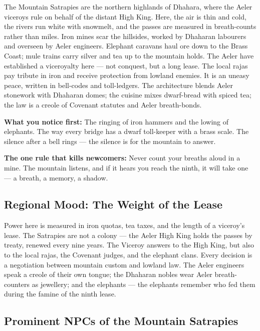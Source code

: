 \vspace{2mm}
\begin{tcolorbox}[colback=black!3,colframe=blue!60!black,title={Theme \& Atmosphere}]
The Mountain Satrapies are the northern highlands of Dhahara, where the Aeler viceroys rule on behalf of the distant High King. Here, the air is thin and cold, the rivers run white with snowmelt, and the passes are measured in breath-counts rather than miles. Iron mines scar the hillsides, worked by Dhaharan labourers and overseen by Aeler engineers. Elephant caravans haul ore down to the Brass Coast; mule trains carry silver and tea up to the mountain holds. The Aeler have established a viceroyalty here — not conquest, but a long lease. The local rajas pay tribute in iron and receive protection from lowland enemies. It is an uneasy peace, written in bell-codes and toll-ledgers. The architecture blends Aeler stonework with Dhaharan domes; the cuisine mixes dwarf-bread with spiced tea; the law is a creole of Covenant statutes and Aeler breath-bonds.

\vspace{2mm}
\textbf{What you notice first:} The ringing of iron hammers and the lowing of elephants. The way every bridge has a dwarf toll-keeper with a brass scale. The silence after a bell rings — the silence is for the mountain to answer.

\textbf{The one rule that kills newcomers:} Never count your breaths aloud in a mine. The mountain listens, and if it hears you reach the ninth, it will take one — a breath, a memory, a shadow.
\end{tcolorbox}

\subsection*{Regional Mood: The Weight of the Lease}

Power here is measured in iron quotas, tea taxes, and the length of a viceroy's lease. The Satrapies are not a colony — the Aeler High King holds the passes by treaty, renewed every nine years. The Viceroy answers to the High King, but also to the local rajas, the Covenant judges, and the elephant clans. Every decision is a negotiation between mountain custom and lowland law. The Aeler engineers speak a creole of their own tongue; the Dhaharan nobles wear Aeler breath-counters as jewellery; and the elephants — the elephants remember who fed them during the famine of the ninth lease.

\subsection*{Prominent NPCs of the Mountain Satrapies}
\label{sec:satrapies-npcs}

